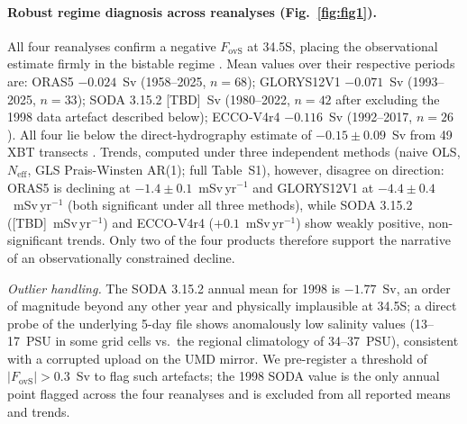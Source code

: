 \documentclass[12pt,a4paper]{article}
\newcommand{\Fovs}{F_\mathrm{ovS}}
\begin{document}
\paragraph{Robust regime diagnosis across reanalyses (Fig.~\ref{fig:fig1}).}
All four reanalyses confirm a negative $\Fovs$ at 34.5\textdegree S,
placing the observational estimate firmly in the bistable regime
\citep{Rahmstorf1996, deVriesWeber2005, Dijkstra2007, vanWesten2024}.
Mean values over their respective periods are:
ORAS5 ${-0.024}$~Sv (1958--2025, $n=68$);
GLORYS12V1 ${-0.071}$~Sv (1993--2025, $n=33$);
SODA 3.15.2 [TBD]~Sv (1980--2022, $n=42$ after excluding the
1998 data artefact described below);
ECCO-V4r4 ${-0.116}$~Sv (1992--2017, $n=26$). All four lie below the
direct-hydrography estimate of ${-0.15\pm 0.09}$~Sv from 49 XBT
transects \citep{Dong2024}. Trends, computed under three independent
methods (naive OLS, \citet{Santer2000} $N_\mathrm{eff}$, GLS
Prais-Winsten AR(1); full Table~S1), however, disagree on direction:
ORAS5 is declining at ${-1.4\pm 0.1}$~mSv\,yr$^{-1}$ and GLORYS12V1 at
${-4.4\pm 0.4}$~mSv\,yr$^{-1}$ (both significant under all three
methods), while SODA 3.15.2 ([TBD]~mSv\,yr$^{-1}$) and ECCO-V4r4
($+0.1$~mSv\,yr$^{-1}$) show weakly positive, non-significant trends.
Only two of the four products therefore support the
\citet{Portmann2026} narrative of an observationally constrained
decline.

\emph{Outlier handling.} The SODA 3.15.2 annual mean for 1998 is
$-1.77$~Sv, an order of magnitude beyond any other year and
physically implausible at 34.5\textdegree S; a direct probe of the
underlying 5-day file shows anomalously low salinity values (13--17~PSU
in some grid cells vs.\ the regional climatology of 34--37~PSU),
consistent with a corrupted upload on the UMD mirror. We pre-register
a threshold of $|\Fovs| > 0.3$~Sv to flag such artefacts; the 1998
SODA value is the only annual point flagged across the four
reanalyses and is excluded from all reported means and trends.
\end{document}
